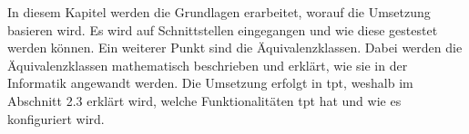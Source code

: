 In diesem Kapitel werden die Grundlagen erarbeitet, worauf die Umsetzung basieren wird.
Es wird auf Schnittstellen eingegangen und wie diese gestestet werden können. Ein weiterer Punkt sind
die Äquivalenzklassen. Dabei werden die Äquivalenzklassen mathematisch beschrieben und erklärt, wie sie in 
der Informatik angewandt werden.
Die Umsetzung erfolgt in \ac{tpt}, weshalb im Abschnitt 2.3 erklärt wird, welche Funktionalitäten \ac{tpt} hat und wie es 
konfiguriert wird.